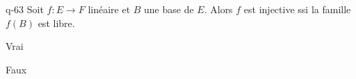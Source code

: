 \begin{truefalse}{q-63}
Soit $f : E \to F$ linéaire et $B$  une base de $E$. Alors $f$ est injective ssi la famille $f(B)$ est libre.
\item* Vrai
\item Faux
\end{truefalse}

